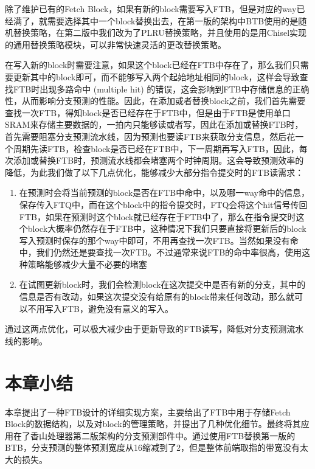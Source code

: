 除了维护已有的Fetch Block，如果有新的block需要写入FTB，但是对应的way已经满了，就需要选择其中一个block替换出去，在第一版的架构中BTB使用的是随机替换策略，在第二版中我们改为了PLRU替换策略，并且使用的是用Chisel实现的通用替换策略模块，可以非常快速灵活的更改替换策略。

在写入新的block时需要注意，如果这个block已经在FTB中存在了，那么我们只需要更新其中的block即可，而不能够写入两个起始地址相同的block，这样会导致查找FTB时出现多路命中 (multiple hit) 的错误，这会影响到FTB中存储信息的正确性，从而影响分支预测的性能。因此，在添加或者替换block之前，我们首先需要查找一次FTB，得知block是否已经存在于FTB中，但是由于FTB是使用单口SRAM来存储主要数据的，一拍内只能够读或者写，因此在添加或替换FTB时，首先需要阻塞分支预测流水线，因为预测也要读FTB来获取分支信息，然后花一个周期先读FTB，检查block是否已经在FTB中，下一周期再写入FTB，因此，每次添加或替换FTB时，预测流水线都会堵塞两个时钟周期。这会导致预测效率的降低，为此我们做了以下几点优化，能够减少大部分指令提交时的FTB读需求：

\begin{enumerate}
	\item 在预测时会将当前预测的block是否在FTB中命中，以及哪一way命中的信息，保存传入FTQ中，而在这个block中的指令提交时，FTQ会将这个hit信号传回FTB，如果在预测时这个block就已经存在于FTB中了，那么在指令提交时这个block大概率仍然存在于FTB中，这种情况下我们只要直接将更新后的block写入预测时保存的那个way中即可，不用再查找一次FTB。当然如果没有命中，我们仍然还是要查找一次FTB。不过通常来说FTB的命中率很高，使用这种策略能够减少大量不必要的堵塞
	\item 在试图更新block时，我们会检测block在这次提交中是否有新的分支，其中的信息是否有改动，如果这次提交没有给原有的block带来任何改动，那么就可以不用写入FTB，避免没有意义的写入。
\end{enumerate}

通过这两点优化，可以极大减少由于更新导致的FTB读写，降低对分支预测流水线的影响。


\section{本章小结}

本章提出了一种FTB设计的详细实现方案，主要给出了FTB中用于存储Fetch Block的数据结构，以及对block的管理策略，并提出了几种优化细节。最终将其应用在了香山处理器第二版架构的分支预测部件中。通过使用FTB替换第一版的BTB，分支预测的整体预测宽度从16缩减到了2，但是整体前端取指的带宽没有太大的损失。
